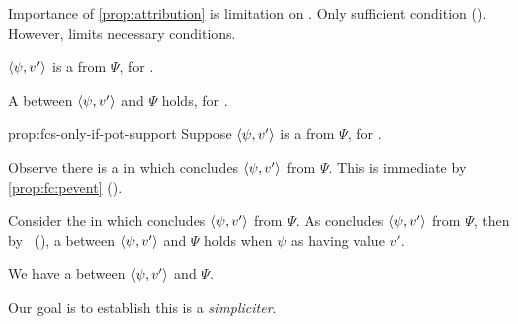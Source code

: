 \begin{note}
  Importance of \autoref{prop:attribution} is limitation on \ros{}.
  Only sufficient condition (\supportI{}).
  However, \supportII{} limits necessary conditions.
\end{note}


\begin{note}
  \begin{proposition}
    \label{prop:fcs-only-if-pot-support}

    \begin{itenum}
    \item[\emph{If}:]
      \(\langle \psi, v' \rangle\) is a  from \(\Psi\), for \vAgent{}.
    \item[\emph{Then}:]
      A  between \(\langle \psi, v' \rangle\) and \(\Psi\) holds, for \vAgent{}.
    \end{itenum}
    \vspace{-\baselineskip}
  \end{proposition}

  \begin{argument}{prop:fcs-only-if-pot-support}
    Suppose \(\langle \psi, v' \rangle\) is a  from \(\Psi\), for \vAgent{}.

    \smallskip
    Observe there is a \pevent{} in which \vAgent{} concludes \(\langle \psi, v' \rangle\) from \(\Psi\).
    This is immediate by \autoref{prop:fc:pevent} ().

    \smallskip
    Consider the \pevent{} in which \vAgent{} concludes \(\langle \psi, v' \rangle\) from \(\Psi\).
    As \vAgent{} concludes \(\langle \psi, v' \rangle\) from \(\Psi\), then by~\supportI{} (\supportIpage{}), a \ros{} between \(\langle \psi, v' \rangle\) and \(\Psi\) holds when \vAgent{}  \(\psi\) as having value \(v'\).

    We have a \potential{} \ros{} between \(\langle \psi, v' \rangle\) and \(\Psi\).

    Our goal is to establish this \potential{} \ros{} is a \ros{} \emph{simpliciter}.


\end{argument}
\end{note}
